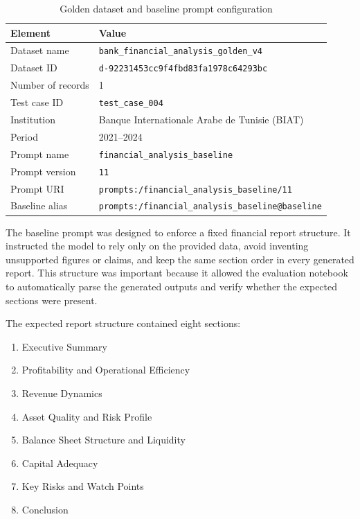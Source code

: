 \begin{table}[H]
\centering
\caption{Golden dataset and baseline prompt configuration}
\begin{tabular}{|l|l|}
\hline
\textbf{Element} & \textbf{Value} \\
\hline
Dataset name & \texttt{bank\_financial\_analysis\_golden\_v4} \\
\hline
Dataset ID & \texttt{d-92231453cc9f4fbd83fa1978c64293bc} \\
\hline
Number of records & 1 \\
\hline
Test case ID & \texttt{test\_case\_004} \\
\hline
Institution & Banque Internationale Arabe de Tunisie (BIAT) \\
\hline
Period & 2021--2024 \\
\hline
Prompt name & \texttt{financial\_analysis\_baseline} \\
\hline
Prompt version & \texttt{11} \\
\hline
Prompt URI & \texttt{prompts:/financial\_analysis\_baseline/11} \\
\hline
Baseline alias & \texttt{prompts:/financial\_analysis\_baseline@baseline} \\
\hline
\end{tabular}
\end{table}

The baseline prompt was designed to enforce a fixed financial report structure. It instructed the model to rely only on the provided data, avoid inventing unsupported figures or claims, and keep the same section order in every generated report. This structure was important because it allowed the evaluation notebook to automatically parse the generated outputs and verify whether the expected sections were present.

The expected report structure contained eight sections:

\begin{enumerate}
    \item Executive Summary
    \item Profitability and Operational Efficiency
    \item Revenue Dynamics
    \item Asset Quality and Risk Profile
    \item Balance Sheet Structure and Liquidity
    \item Capital Adequacy
    \item Key Risks and Watch Points
    \item Conclusion
\end{enumerate}

